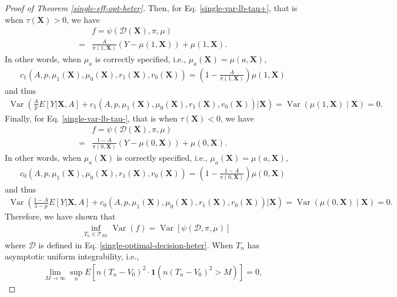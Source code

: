 \documentclass[11pt]{article}
\theoremstyle{referenceplain}
\theoremstyle{referencedefinition}
\theoremstyle{referenceremark}
\begin{document}
\begin{proof}[Proof of Theorem \ref{single-eff-opt-heter}]
Then, for Eq. \eqref{single-var-lb-tau+}, that is when $\tau(\mathbf{X})>0$,  we  have
\begin{align*}
    &f = \psi(\mathcal{D}(\mathbf{X}),\pi,\mu)\\
    =&\frac{A}{\pi(1,\mathbf{X})}(Y - \mu(1,\mathbf{X})) + \mu(1,\mathbf{X}).
\end{align*}
In other words, when $\mu_a$ is correctly specified, i.e., $\mu_a(\mathbf{X}) = \mu(a,\mathbf{X})$,
\begin{align*}
    c_1(A,p,\mu_1(\mathbf{X}),\mu_0(\mathbf{X}),r_1(\mathbf{X}),r_0(\mathbf{X})) = \left(1-\frac{A}{\pi(1,\mathbf{X})}\right)\mu(1,\mathbf{X})
\end{align*}
and thus
\begin{align*}
    \operatorname{Var}\left(\frac{A}{p}E[Y|\mathbf{X},A]+c_1(A,p,\mu_1(\mathbf{X}),\mu_0(\mathbf{X}),r_1(\mathbf{X}),r_0(\mathbf{X}))\bigg|\mathbf{X}\right) = \operatorname{Var}(\mu(1,\mathbf{X})\mid \mathbf{X}) = 0.
\end{align*}
Finally, for Eq. \eqref{single-var-lb-tau-}, that is when $\tau(\mathbf{X})<0$,  we  have
\begin{align*}
    &f = \psi(\mathcal{D}(\mathbf{X}),\pi,\mu)\\
    =&\frac{1-A}{\pi(0,\mathbf{X})}(Y - \mu(0,\mathbf{X})) + \mu(0,\mathbf{X}).
\end{align*}
In other words, when $\mu_a(\mathbf{X})$ is correctly specified, i.e., $\mu_a(\mathbf{X}) = \mu(a,\mathbf{X})$,
\begin{align*}
    c_0(A,p,\mu_1(\mathbf{X}),\mu_0(\mathbf{X}),r_1(\mathbf{X}),r_0(\mathbf{X})) = \left(1-\frac{1-A}{\pi(0,\mathbf{X})}\right)\mu(0,\mathbf{X})
\end{align*}
and thus
\begin{align*}
    \operatorname{Var}\left(\frac{1-A}{1-p}E[Y|\mathbf{X},A]+c_0(A,p,\mu_1(\mathbf{X}),\mu_0(\mathbf{X}),r_1(\mathbf{X}),r_0(\mathbf{X}))\bigg|\mathbf{X}\right) = \operatorname{Var}(\mu(0,\mathbf{X})\mid \mathbf{X}) = 0.
\end{align*}
Therefore, we have shown that
\begin{align*}
    &\inf_{T_n\in\mathcal{T}_{RL}}\operatorname{Var}(f) 
    =\operatorname{Var}\left[\psi(\mathcal{D},\pi,\mu)\right]
\end{align*}
where $\mathcal{D}$ is defined in Eq. \eqref{single-optimal-decision-heter}. When $T_n$ has asymptotic uniform integrability, i.e., 
    \begin{align}\label{AUI}
        \lim _{M \rightarrow \infty} \sup _n E\left[n\left(T_n-V_0\right)^2 \cdot \mathbf{1}\left(n\left(T_n-V_0\right)^2>M\right)\right]=0,

\end{align}
\end{proof}
\end{document}
